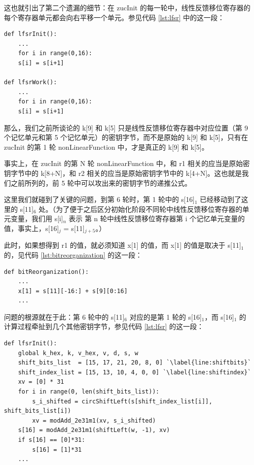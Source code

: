\vspace*{0.5\baselineskip}

这也就引出了第二个遗漏的细节：在 {\cnsls zucInit} 的每一轮中，线性反馈移位寄存器的每个寄存器单元都会向右平移一个单元。参见代码 \ref{lst:lfsr} 中的这一段：

\begin{lstlisting}[style=myPython]
def lfsrInit():
    ...
    for i in range(0,16):
    s[i] = s[i+1]

def lfsrWork():
    ...
    for i in range(0,16):
    s[i] = s[i+1]
\end{lstlisting}

\newpage

那么，我们之前所谈论的 {\cnsls k[9]} 和 {\cnsls k[5]} 只是线性反馈移位寄存器中对应位置（第 9 个记忆单元和第 5 个记忆单元）的密钥字节，而不是原始的 {\cnsls k[9]} 和 {\cnsls k[5]}，只有在 {\cnsls zucInit} 的第 1 轮 {\cnsls nonLinearFunction} 中，才是真正的 {\cnsls k[9]} 和 {\cnsls k[5]}。

事实上，在 {\cnsls zucInit} 的第 N 轮 {\cnsls nonLinearFunction} 中，和 {\cnsls r1} 相关的应当是原始密钥字节中的 {\cnsls k[8+N]}，和  {\cnsls r2} 相关的应当是原始密钥字节中的 {\cnsls k[4+N]}。这也就是我们之前所列的，前 5 轮中可以攻出来的密钥字节的递推公式。

这里我们就碰到了关键的问题，到第 6 轮时，第 1 轮中的 {\cnsls s[16]$_1$} 已经移动到了这里的 {\cnsls s[11]$_6$} 处。（为了便于之后区分初始化阶段不同轮中线性反馈移位寄存器的单元变量，我们用 {\color{blue} {\cnsls s[i]$_n$}} 表示 {\color{blue} 第 {\cnsls n} 轮中线性反馈移位寄存器第 {\cnsls i} 个记忆单元变量的值}，事实上，{\cnsls s[16]$_j$} = {\cnsls s[11]$_{j+5}$}。）

此时，如果想得到 {\cnsls r1} 的值，就必须知道 {\cnsls x[1]} 的值，而 {\cnsls x[1]} 的值是取决于 {\cnsls s[11]$_1$} 的，见代码 \ref{lst:bitreorganization} 的这一段：

\begin{lstlisting}[style=myPython]
def bitReorganization():
    ...
    x[1] = s[11][-16:] + s[9][0:16]
    ...
\end{lstlisting}

\vspace*{0.5\baselineskip}

问题的根源就在于此：第 6 轮中的 {\cnsls s[11]$_6$} 对应的是第 1 轮的 {\cnsls s[16]$_1$}，而 {\cnsls s[16]$_1$} 的计算过程牵扯到几个其他密钥字节，参见代码 \ref{lst:lfsr} 的这一段：

\begin{lstlisting}[style=myPython]
def lfsrInit():
    global k_hex, k, v_hex, v, d, s, w
    shift_bits_list  = [15, 17, 21, 20, 8, 0] `\label{line:shiftbits}`
    shift_index_list = [15, 13, 10, 4, 0, 0] `\label{line:shiftindex}`
    xv = [0] * 31
    for i in range(0, len(shift_bits_list)):
        s_i_shifted = circShiftLeft(s[shift_index_list[i]], shift_bits_list[i])
        xv = modAdd_2e31m1(xv, s_i_shifted)
    s[16] = modAdd_2e31m1(shiftLeft(w, -1), xv)
    if s[16] == [0]*31:
        s[16] = [1]*31
    ...
\end{lstlisting}


